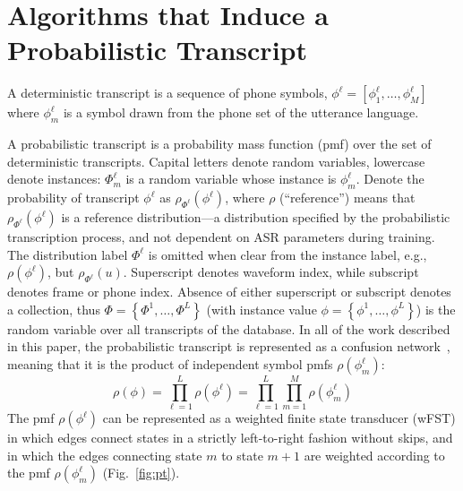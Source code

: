 \section{Algorithms that Induce a Probabilistic Transcript}

A deterministic transcript is a sequence of phone symbols,
$\phi^\ell =[\phi_1^\ell,\ldots,\phi_M^\ell]$ where $\phi_m^\ell$ is a
symbol drawn from the phone set of the utterance language.

A probabilistic transcript is a probability mass function (pmf)
over the set of deterministic transcripts.  Capital letters denote
random variables, lowercase denote instances: $\Phi^{\ell}_m$ is a
random variable whose instance is $\phi_m^\ell$.
Denote the probability of transcript $\phi^{\ell}$
as $\rho_{\Phi^\ell}(\phi^{\ell})$, where $\rho$ (``reference'') means
that $\rho_{\Phi^\ell}(\phi^{\ell})$ is a reference distribution---a
distribution specified by the probabilistic transcription process, and
not dependent on ASR parameters during training.  The
distribution label $\Phi^\ell$ is omitted when clear from the instance
label, e.g., $\rho(\phi^\ell)$, but $\rho_{\Phi^\ell}(u)$.
Superscript denotes waveform index, while subscript denotes frame or
phone index.  Absence of either superscript or subscript denotes a
collection, thus $\Phi=\left\{\Phi^1,\ldots,\Phi^L\right\}$ (with
instance value $\phi=\left\{\phi^1,\ldots,\phi^L\right\}$) is the
random variable over all transcripts of the database.  In all of
the work described in this paper, the probabilistic transcript is
represented as a confusion network~\cite{Mangu00}, meaning that it is
the product of independent symbol pmfs $\rho(\phi_m^\ell)$:
\begin{equation}
  \rho(\phi)=\prod_{\ell=1}^L\rho(\phi^\ell)=
  \prod_{\ell=1}^L \prod_{m=1}^M \rho(\phi_m^{\ell})
\end{equation}
The pmf $\rho(\phi^\ell)$ can be represented as a weighted
finite state transducer (wFST) in which edges connect states in a
strictly left-to-right fashion without skips, and in which the edges
connecting state $m$ to state $m+1$ are weighted according to the pmf
$\rho(\phi_m^\ell)$ (Fig.~\ref{fig:pt}).
